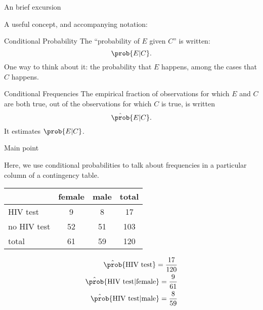 \begin{frame}{An brief excursion}

    A useful concept, and accompanying notation:
    \begin{block}{Conditional Probability}
        The ``\alert{probability of $E$ given $C$}''
        is written:
        \[ \prob\{ E \vert C \} . \]
        One way to think about it: the probability that $E$ happens, among the cases that $C$ happens.
    \end{block}

    \vspace{2em}

    \begin{block}{Conditional Frequencies}
        The empirical fraction of observations for which $E$ and $C$ are both true,
        out of the observations for which $C$ is true,
        is  written
        \[ \hat \prob \{ E \vert C \} .  \]
        It estimates $\prob\{E \vert C\}$.
    \end{block}

\end{frame}


\begin{frame}{Main point}

    Here, we use conditional probabilities
    to talk about frequencies \alert{in a particular column}
    of a contingency table.

    \vspace{2em}

    \begin{center}
        \begin{tabular}{lcc|c}
            & female & male & total \\
            \hline
            HIV test & 9 & 8 & 17 \\
            no HIV test & 52 & 51 & 103 \\
            \hline
            total & 61 & 59 & 120 \\
        \end{tabular}
    \end{center}

    \vspace{1em}

    \begin{align*}
        \hat \prob\{ \text{HIV test} \} = \frac{17}{120} \\
        \hat \prob\{ \text{HIV test} \vert \text{female} \} = \frac{9}{61} \\
        \hat \prob\{ \text{HIV test} \vert \text{male} \} = \frac{8}{59} \\
    \end{align*}

\end{frame}

